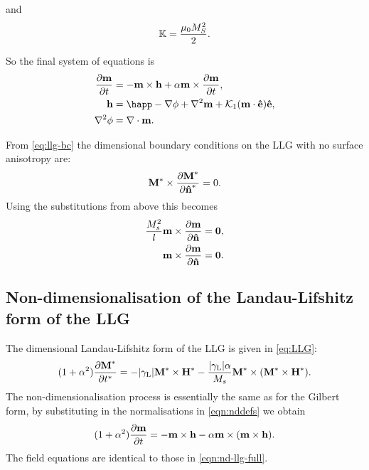 and
\begin{equation}
  \label{k-normalisation}
  \mathbb{K} = \frac{ \mu_0 M_S^2}{2}.
\end{equation}

So the final system of equations is
\begin{equation}
  \begin{aligned}
    \dmdt &= - \mv \times \hv + \alpha \mv \times \dmdt, \\
    \hv &= \happ - \grad \phi + \lap \mv + \kone (\mv \cdot \ev) \ev, \\
    \lap \phi &= \div \mv.
    \label{eqn:nd-llg-full}
  \end{aligned}
\end{equation}

From \cref{eq:llg-bc} the dimensional boundary conditions on the LLG with no surface anisotropy are:
\begin{equation}
  \boldsymbol{\mathrm{M}}^* \times \frac{\partial \boldsymbol{\mathrm{M}}^*}{\partial \boldsymbol{\mathrm{\hat{n}}}^*} = 0.
\end{equation}
Using the substitutions from above this becomes
\begin{equation}
  \begin{aligned}
    \frac{M_s^2}{l} \boldsymbol{\mathrm{m}} \times \frac{\partial \boldsymbol{\mathrm{m}}}{\partial \boldsymbol{\mathrm{\hat{n}}}} &= \mathbf{0}, \\
    \boldsymbol{\mathrm{m}} \times \frac{\partial \boldsymbol{\mathrm{m}}}{\partial \boldsymbol{\mathrm{\hat{n}}}} &= \mathbf{0}.
  \end{aligned}
\end{equation}

\subsection{Non-dimensionalisation of the Landau-Lifshitz form of the LLG}
\label{sec:land-lifsh-normalisation}

The dimensional Landau-Lifshitz form of the LLG is given in \cref{eq:LLG}:
\begin{equation}
  \label{eq:ll-nd}
  (1 + \alpha^2) \frac{\partial \boldsymbol{\mathrm{M}}^*}{\partial t^*} = - {\left|{\gamma_{\mathrm{\tiny{L}}}} \right|} \boldsymbol{\mathrm{M}}^* \times \boldsymbol{\mathrm{H}}^*
  - \frac{{\left|{\gamma_{\mathrm{\tiny{L}}}} \right|} \alpha}{M_s} \boldsymbol{\mathrm{M}}^* \times (\boldsymbol{\mathrm{M}}^* \times \boldsymbol{\mathrm{H}}^*).
\end{equation}
The non-dimensionalisation process is essentially the same as for the Gilbert form, by substituting in the normalisations in \cref{eqn:nddefs} we obtain
\begin{equation}
  (1 + \alpha^2) \frac{\partial \boldsymbol{\mathrm{m}}}{\partial t} = - \boldsymbol{\mathrm{m}} \times \boldsymbol{\mathrm{h}} - \alpha \boldsymbol{\mathrm{m}} \times (\boldsymbol{\mathrm{m}} \times \boldsymbol{\mathrm{h}}).
  \label{eq:ll-nd-llglike}
\end{equation}
The field equations are identical to those in \cref{eqn:nd-llg-full}.


